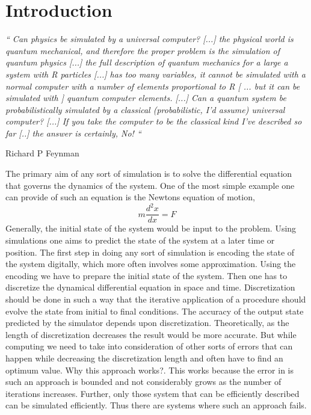 \chapter{Introduction}
\emph{“ Can physics be simulated by a universal computer? [...] the physical world is quantum mechanical, and therefore the proper problem is the simulation of quantum physics [...] the full description of quantum mechanics for a large a system with R particles [...] has too many variables, it cannot be simulated with a normal computer with a number of elements proportional to R [ ... but it can be simulated with ] quantum computer elements. [...] Can a quantum system be probabilistically simulated by a classical (probabilistic, I’d assume) universal computer? [...] If you take the computer to be the classical kind I’ve described so far [..] the answer is certainly, No! “} 
\begin{flushright}
Richard P Feynman \cite{feynman82}\cite{nielsen}
\end{flushright}


The primary aim of any sort of simulation is to solve the differential equation that governs the dynamics of the system. One of the most simple example one can provide of such an equation is the Newtons equation of motion,
\begin{equation}
m\frac{d^{2}x}{dx} = F
\end{equation}
Generally, the initial state of the system would be input to the problem. Using simulations one aims to predict the state of the system at a later time or position. The first step in doing any sort of simulation is encoding the state of the system digitally, which more often involves some approximation. Using the encoding we have to prepare the initial state of the system. Then one has to discretize the dynamical differential equation in space and time. Discretization should be done in such a way that the iterative application of a procedure should evolve the state from initial to final conditions. The accuracy of the output state predicted by the simulator depends upon discretization. Theoretically, as the length of discretization decreases the result would be more accurate. But while computing we need to take into consideration of other sorts of errors that can happen while decreasing the discretization length and often have to find an optimum value. Why this approach works?. This works because the error in is such an approach is bounded and not considerably grows as the number of iterations increases\cite{nielsen}. Further, only those system that can be efficiently described can be simulated efficiently. Thus there are systems where such an approach fails.

